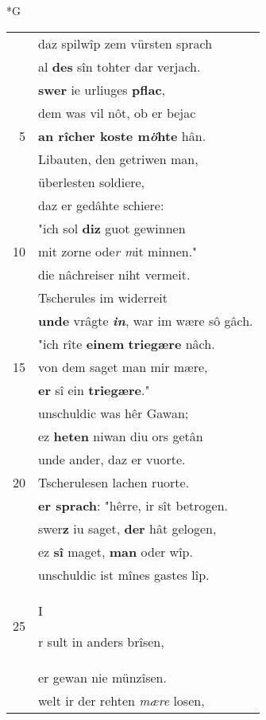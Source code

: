 \documentclass[8pt,a4paper,notitlepage]{article}
\begin{document}
\newpage
\begin{table}[ht]
\begin{minipage}[t]{0.5\linewidth}
\small
\begin{center}*G
\end{center}
\begin{tabular}{rl}
 & daz spilwîp zem vürsten sprach\\ 
 & al \textbf{des} sîn tohter dar verjach.\\ 
 & \textbf{swer} ie urliuges \textbf{pflac},\\ 
 & dem was vil nôt, ob er bejac\\ 
5 & \textbf{an rîcher koste m\textit{ö}hte} hân.\\ 
 & Libauten, den getriwen man,\\ 
 & überlesten soldiere,\\ 
 & daz er gedâhte schiere:\\ 
 & "ich sol \textbf{diz} guot gewinnen\\ 
10 & mit zorne ode\textit{r m}it minnen."\\ 
 & die nâchreiser niht vermeit.\\ 
 & Tscherules im widerreit\\ 
 & \textbf{unde} vrâgte \textit{\textbf{in}}, war im wære sô gâch.\\ 
 & "ich rîte \textbf{einem} \textbf{triegære} nâch.\\ 
15 & von dem saget man mir mære,\\ 
 & \textbf{er} sî ein \textbf{triegære}."\\ 
 & unschuldic was hêr Gawan;\\ 
 & ez \textbf{heten} niwan diu ors getân\\ 
 & unde ander, daz er vuorte.\\ 
20 & Tscherulesen lachen ruorte.\\ 
 & \textbf{er sprach}: "hêrre, ir sît betrogen.\\ 
 & swer\textbf{z} iu saget, \textbf{der} hât gelogen,\\ 
 & ez \textbf{sî} maget, \textbf{man} oder wîp.\\ 
 & unschuldic ist mînes gastes lîp.\\ 
25 & \begin{large}I\end{large}r sult in anders brîsen,\\ 
 & er gewan nie münzîsen.\\ 
 & welt ir der rehten \textit{mære} losen,\\ 

\end{tabular}
\end{minipage}
\end{table}
\end{document}
